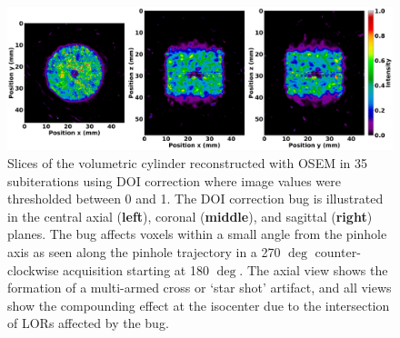 \documentclass[utf8]{FrontiersinVancouver}
\begin{document}
\begin{figure}[ht!]
\begin{center}
\includegraphics[width=\textwidth]{Figures/DOI_CylVol_bug}
\end{center}
\caption{Slices of the volumetric cylinder reconstructed with OSEM in 35 subiterations using DOI correction where image values were thresholded between 0 and 1. The DOI correction bug is illustrated in the central axial (\textbf{left}), coronal (\textbf{middle}), and sagittal (\textbf{right}) planes. The bug affects voxels within a small angle from the pinhole axis as seen along the pinhole trajectory in a 270 $\deg$ counter-clockwise acquisition starting at 180 $\deg$. The axial view shows the formation of a multi-armed cross or `star shot' artifact, and all views show the compounding effect at the isocenter due to the intersection of LORs affected by the bug.}
\label{fig:DOIbug}
\end{figure}
\end{document}
